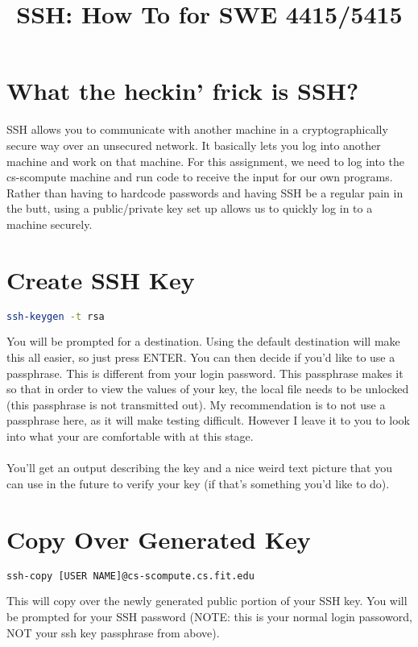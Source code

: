 \documentclass[12pt]{article}
\theoremstyle{plain}
\theoremstyle{definition}
\begin{document}
\title{SSH: How To for SWE 4415/5415}
\author{\vspace{-5ex}}
\predate{}
\postdate{}
\date{}
\preauthor{}
\postauthor{}

\maketitle

\section*{What the heckin' frick is SSH?}
SSH allows you to communicate with another machine in a cryptographically secure way over an unsecured network.  It basically lets you log into another machine and work on that machine.  For this assignment, we need to log into the cs-scompute machine and run code to receive the input for our own programs.  Rather than having to hardcode passwords and having SSH be a regular pain in the butt, using a public/private key set up allows us to quickly log in to a machine securely.
\section*{Create SSH Key}
\begin{lstlisting}[language =bash]
ssh-keygen -t rsa
\end{lstlisting}
You will be prompted for a destination.  Using the default destination will make this all easier, so just press ENTER.  You can then decide if you'd like to use a passphrase.  This is different from your login password.  This passphrase makes it so that in order to view the values of your key, the local file needs to be unlocked (this passphrase is not transmitted out).  My recommendation is to not use a passphrase here, as it will make testing difficult.  However I leave it to you to look into what your are comfortable with at this stage.\\
\\
You'll get an output describing the key and a nice weird text picture that you can use in the future to verify your key (if that's something you'd like to do).

\section*{Copy Over Generated Key}
\begin{lstlisting}[language =bash]
ssh-copy [USER NAME]@cs-scompute.cs.fit.edu
\end{lstlisting}
This will copy over the newly generated public portion of your SSH key. You will be prompted for your SSH password (NOTE: this is your normal login passoword, NOT your ssh key passphrase from above). 
\end{document}
